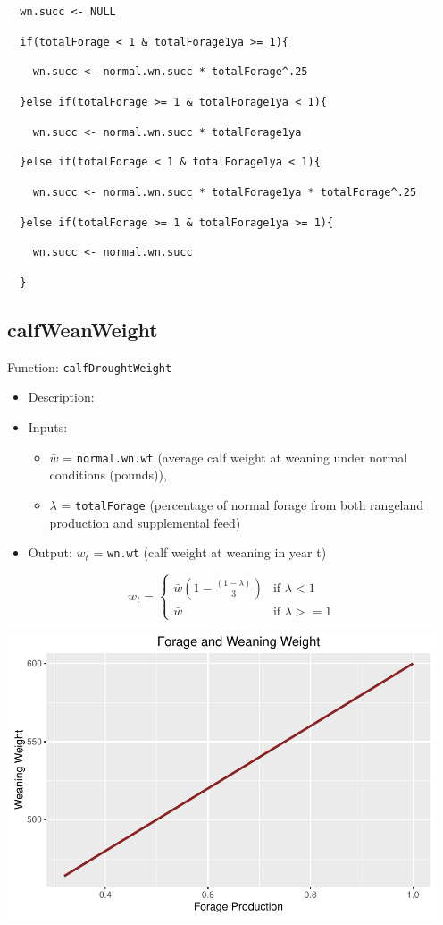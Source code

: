 \documentclass[11pt]{article}
\begin{document}
\verb!  wn.succ <- NULL!

\verb!  if(totalForage < 1 & totalForage1ya >= 1){!

\verb!    wn.succ <- normal.wn.succ * totalForage^.25!

\verb!  }else if(totalForage >= 1 & totalForage1ya < 1){!

\verb!    wn.succ <- normal.wn.succ * totalForage1ya!

\verb!  }else if(totalForage < 1 & totalForage1ya < 1){!

\verb!    wn.succ <- normal.wn.succ * totalForage1ya * totalForage^.25!

\verb!  }else if(totalForage >= 1 & totalForage1ya >= 1){!

\verb!    wn.succ <- normal.wn.succ!

\verb!  }!


\subsection{calfWeanWeight}
Function: \verb!calfDroughtWeight!
	\begin{itemize}
	\item Description:
	\item Inputs: 
		\begin{itemize}
		\item $\bar{w}$ = \verb!normal.wn.wt! (average calf weight at weaning under normal conditions (pounds)), 
		\item $\lambda$ = \verb!totalForage! (percentage of normal forage from both rangeland production and supplemental feed)
		\end{itemize} 
	\item Output: $w_t$ = \verb!wn.wt! (calf weight at weaning in year t)
	\end{itemize}

\begin{equation} \label{calfdroughtweight}
w_{t} = 
\begin{cases}
\bar{w} \left(1 - \frac{(1 - \lambda)}{3}\right) & \text{if } \lambda < 1 \\
\bar{w} & \text{if } \lambda >= 1
\end{cases}
\end{equation}


\includegraphics[width=5in]{weaningweight}
\end{document}
